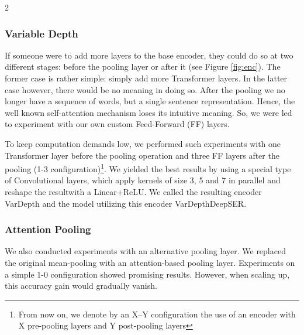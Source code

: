 \documentclass[10pt]{article}
\begin{document}
\begin{multicols}{2}
\subsubsection{Variable Depth}
\par If someone were to add more layers to the base encoder, they could do so at two different stages: before the pooling layer or after it (see Figure \ref{fig:enc}). The former case is rather simple: simply add more Transformer layers. In the latter case however, there would be no meaning in doing so. After the pooling we no longer have a sequence of words, but a single sentence representation. Hence, the well known self-attention mechanism \cite{attention} loses its intuitive meaning. So, we were led to experiment with our own custom Feed-Forward (FF) layers.
\par To keep computation demands low, we performed such experiments with one Transformer layer before the pooling operation and three FF layers after the pooling (1-3 configuration)\footnote{From now on, we denote by an X–Y configuration the use of an encoder with X pre-pooling layers and Y post-pooling layers}. We yielded the best results by using a special type of Convolutional layers, which apply kernels of size 3, 5 and 7 in parallel and reshape the resultwith a Linear+ReLU. We called the resulting encoder VarDepth and the model utilizing this encoder VarDepthDeepSER. 

\subsubsection{Attention Pooling}
\par We also conducted experiments with an alternative pooling layer. We replaced the original mean-pooling with an attention-based pooling layer. Experiments on a simple 1-0 configuration showed promising results. However, when scaling up, this accuracy gain would gradually vanish.


\end{multicols}
\end{document}
